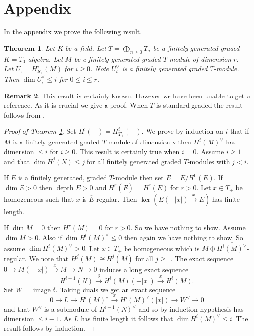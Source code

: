 \documentclass{amsart}
\newcommand{\rt}{\rightarrow}
\newcommand{\ov}{\overline}
\newcommand{\image}{\operatorname{image}}
\newcommand{\depth}{\operatorname{depth}}
\theoremstyle{plain}
\newtheorem{theorem}{Theorem}[section]
\theoremstyle{definition}
\newtheorem{remark}[theorem]{Remark}
\theoremstyle{remark}
\begin{document}
\section{Appendix}
In the appendix we prove the following result.
\begin{theorem}
\label{dual-dim} Let $K$ be a field. Let $T= \bigoplus_{n \geq 0}T_n$ be a finitely generated graded $K = T_0$-algebra. Let $M$ be a finitely generated graded $T$-module of dimension $r$. Let $U_i = H^i_{S_+}(M)$  for $i \geq 0$. Note $U_i^{\vee}$ is a finitely generated graded $T$-module. Then $\dim U_i^\vee \leq i$ for $0 \leq i \leq r$.
\end{theorem}
\begin{remark}
This result is certainly known. However we have been unable to get a reference. As it is crucial we give a proof. When $T$ is standard graded the result follows from \cite[17.1.9]{bs}.
\end{remark}
\begin{proof}[Proof of Theorem \ref{dual-dim}]
Set $H^i(-)  = H^i_{T_+}(-)$.
We prove by induction on $i$ that if $M$ is a finitely generated graded $T$-module of dimension $s$ then $H^i(M)^\vee $ has dimension $\leq i$ for $i \geq 0$.
This result is certainly true when $i = 0$.
Assume $i \geq 1$ and that $\dim H^j(N) \leq j$ for all finitely generated graded $T$-modules with $j < i$.

If $E$ is a finitely generated, graded $T$-module then set $\ov{E} = E/H^0(E)$. If $\dim E > 0$ then $\depth \ov{E} > 0$ and $H^r(\ov{E}) = H^r(E)$ for $r > 0$. Let $x \in T_+$ be homogeneous such that $x$ is $\ov{E}$-regular. Then $\ker (E(-|x|) \xrightarrow{x} E)$ has finite length.

If $\dim M = 0$ then $H^r(M) = 0$ for $r > 0$. So we have nothing to show. Assume $\dim M > 0$.
Also if $\dim H^i(M)^\vee \leq 0$ then again  we have nothing to show. So assume $\dim H^i(M)^\vee > 0$. Let $x \in T_+$ be homogeneous which is $\ov{M} \oplus \ov{H^i(M)^\vee}$-regular.
We note that $H^j(M) \cong H^j(\ov{M})$ for all $j \geq 1$.
The exact sequence $0 \rt \ov{M}(-|x|) \xrightarrow{x} \ov{M} \rt N \rt 0$ induces a long
exact sequence
$$H^{i-1}(N) \xrightarrow{\delta} H^i(M)(-|x|) \xrightarrow{x} H^i(M).$$
Set $W = \image \delta$. Taking duals we get an exact sequence
$$ 0 \rt L \rt H^i(M)^\vee \xrightarrow{x} H^i(M)^\vee(|x|) \rt W^\vee \rt 0$$
and that $W^\vee $ is a submodule of $H^{i-1}(N)^\vee$ and so by induction hypothesis  has dimension $\leq i -1$. As $L$ has finite length it follows that $\dim H^i(M)^\vee \leq i$. The result follows by induction.
\end{proof}
\end{document}
